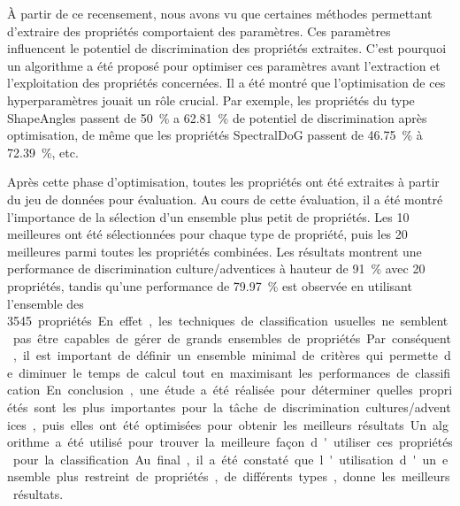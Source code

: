 \documentclass[../thesis.tex]{subfiles}
\begin{document}
    À partir de ce recensement, nous avons vu que certaines méthodes permettant d'extraire des propriétés comportaient des paramètres. Ces paramètres influencent le potentiel de discrimination des propriétés extraites. C'est pourquoi un algorithme a été proposé pour optimiser ces paramètres avant l'extraction et l'exploitation des propriétés concernées. Il a été montré que l'optimisation de ces hyperparamètres jouait un rôle crucial. Par exemple, les propriétés du type ShapeAngles passent de \SI{50}{\percent} a \SI{62.81}{\percent} de potentiel de discrimination après optimisation, de même que les propriétés SpectralDoG passent de \SI{46.75}{\percent} à \SI{72.39}{\percent}, etc.
    
    
    Après cette phase d'optimisation, toutes les propriétés ont été extraites à partir du jeu de données pour évaluation. Au cours de cette évaluation, il a été montré l'importance de la sélection d'un ensemble plus petit de propriétés. Les 10 meilleures ont été sélectionnées pour chaque type de propriété, puis les 20 meilleures parmi toutes les propriétés combinées. Les résultats montrent une performance de discrimination culture/adventices à hauteur de \SI{91}{\percent} avec 20 propriétés, tandis qu'une performance de \SI{79.97}{\percent} est observée en utilisant l'ensemble des \SI{3545} propriétés. En effet, les techniques de classification usuelles ne semblent pas être capables de gérer de grands ensembles de propriétés. Par conséquent, il est important de définir un ensemble minimal de critères qui permette de diminuer le temps de calcul tout en maximisant les performances de classification.
    
    En conclusion, une étude a été réalisée pour déterminer quelles propriétés sont les plus importantes pour la tâche de discrimination cultures/adventices, puis elles ont été optimisées pour obtenir les meilleurs résultats. Un algorithme a été utilisé pour trouver la meilleure façon d'utiliser ces propriétés pour la classification. Au final, il a été constaté que l'utilisation d'un ensemble plus restreint de propriétés, de différents types, donne les meilleurs résultats.
	
\end{document}
